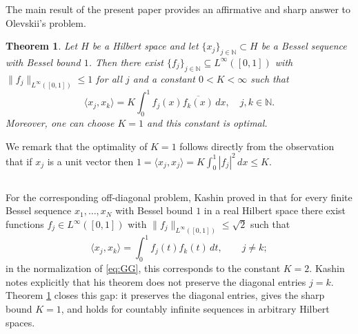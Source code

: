 \documentclass[reqno,a4paper,12pt]{amsart}
\numberwithin{equation}{section}
\newtheorem{theorem}[definition]{Theorem}
\def\N{{\mathbb N}}
\newcommand\1{\mathds{1}}
\begin{document}
The main result of the present paper provides an affirmative and sharp answer to Olevskii's problem.

\begin{theorem}\label{thm:main1}
    Let $H$ be a Hilbert space and let $\{ x_j \}_{j\in \N}\subset H$ be a Bessel sequence with Bessel bound $1$. Then there exist $\{ f_j \}_{j \in \N} \subseteq L^\infty([0,1])$ with $\| f_j \|_{L^\infty([0,1])} \leq 1$ for all $j$ and a constant $0 <K< \infty$ such that
    \begin{equation}
        \langle x_j,x_k \rangle = K \int_0^1 f_j(x) \overline{f_k(x)} \, dx, \quad j,k \in \N.
    \end{equation}
    Moreover, one can choose $K=1$ and this constant is optimal.
\end{theorem}

We remark that the optimality of $K=1$ follows directly from the observation that if $x_{j}$ is a unit vector then $1 = \langle x_{j},x_{j} \rangle = K \int_0^1 |f_{j}|^2 \, dx \leq K$.

\subsection{}
For the corresponding off-diagonal problem, Kashin proved in \cite{kashin2022observation} that for every finite Bessel sequence $x_1, \dots, x_N$ with Bessel bound $1$ in a real Hilbert space there exist functions $f_j\in L^\infty([0,1])$ with $\|f_j\|_{L^\infty([0,1])}\leq \sqrt 2$ such that
$$
\langle x_j,x_k\rangle
=
\int_0^1 f_j(t)f_k(t)\,dt,
\qquad j\neq k;
$$
in the normalization of \eqref{eq:GG}, this corresponds to the constant $K = 2$. Kashin notes explicitly that his theorem does not preserve the diagonal entries $j=k$. Theorem \ref{thm:main1} closes this gap: it preserves the diagonal entries, gives the sharp bound $K=1$, and holds for countably infinite sequences in arbitrary Hilbert spaces.
\end{document}
